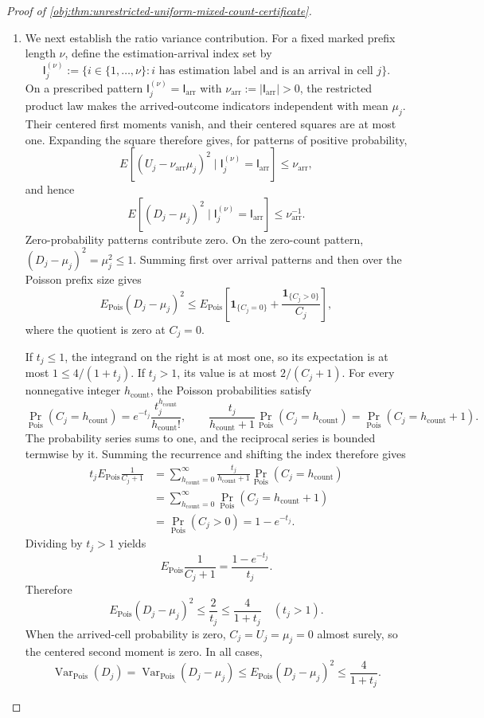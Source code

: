 \begin{proof}[Proof of \cref{obj:thm:unrestricted-uniform-mixed-count-certificate}]
\begin{enumerate}
\item We next establish the ratio variance contribution.
For a fixed marked prefix length \(\nu\), define the estimation-arrival
index set by
\[
\mathsf I_j^{(\nu)}
:=
\{i\in\{1,\ldots,\nu\}:
i\text{ has estimation label and is an arrival in cell }j\}.
\]
On a prescribed pattern \(\mathsf I_j^{(\nu)}=\mathsf I_{\mathrm{arr}}\) with
\(\nu_{\mathrm{arr}}:=|\mathsf I_{\mathrm{arr}}|>0\), the restricted product law makes the
arrived-outcome indicators independent with mean \(\mu_j\). Their centered
first moments vanish, and their centered squares are at most one.
Expanding the square therefore gives, for patterns of positive
probability,
\[
E\!\left[
(U_j-\nu_{\mathrm{arr}}\mu_j)^2
\mid\mathsf I_j^{(\nu)}=\mathsf I_{\mathrm{arr}}
\right]\le\nu_{\mathrm{arr}},
\]
and hence
\[
E\!\left[
(D_j-\mu_j)^2
\mid\mathsf I_j^{(\nu)}=\mathsf I_{\mathrm{arr}}
\right]\le\nu_{\mathrm{arr}}^{-1}.
\]
Zero-probability patterns contribute zero. On the zero-count pattern,
\((D_j-\mu_j)^2=\mu_j^2\le1\). Summing first over arrival patterns and then
over the Poisson prefix size gives
\[
E_{\mathrm{Pois}}(D_j-\mu_j)^2
\le
E_{\mathrm{Pois}}\!\left[
\mathbf1_{\{C_j=0\}}
+\frac{\mathbf1_{\{C_j>0\}}}{C_j}
\right],
\]
where the quotient is zero at \(C_j=0\).

If \(t_j\le1\), the integrand on the right is at most one, so its expectation
is at most \(1\le4/(1+t_j)\). If \(t_j>1\), its value is at most
\(2/(C_j+1)\). For every nonnegative integer \(h_{\mathrm{count}}\), the Poisson probabilities satisfy
\[
\Pr_{\mathrm{Pois}}(C_j=h_{\mathrm{count}})
=e^{-t_j}\frac{t_j^{h_{\mathrm{count}}}}{h_{\mathrm{count}}!},
\qquad
\frac{t_j}{h_{\mathrm{count}}+1}
\Pr_{\mathrm{Pois}}(C_j=h_{\mathrm{count}})
=
\Pr_{\mathrm{Pois}}(C_j=h_{\mathrm{count}}+1).
\]
The probability series sums to one, and the reciprocal series is bounded termwise by it. Summing the recurrence and shifting the index therefore gives
\[
\begin{aligned}
t_jE_{\mathrm{Pois}}\frac1{C_j+1}
&=
\sum_{h_{\mathrm{count}}=0}^{\infty}
\frac{t_j}{h_{\mathrm{count}}+1}
\Pr_{\mathrm{Pois}}(C_j=h_{\mathrm{count}})\\
&=
\sum_{h_{\mathrm{count}}=0}^{\infty}
\Pr_{\mathrm{Pois}}(C_j=h_{\mathrm{count}}+1)\\
&=\Pr_{\mathrm{Pois}}(C_j>0)
=1-e^{-t_j}.
\end{aligned}
\]
Dividing by \(t_j>1\) yields
\[
E_{\mathrm{Pois}}\frac1{C_j+1}
=\frac{1-e^{-t_j}}{t_j}.
\]
Therefore
\[
E_{\mathrm{Pois}}(D_j-\mu_j)^2
\le\frac2{t_j}\le\frac4{1+t_j}
\quad(t_j>1).
\]
When the arrived-cell probability is zero, \(C_j=U_j=\mu_j=0\)
almost surely, so the centered second moment is zero. In all cases,
\[
\operatorname{Var}_{\mathrm{Pois}}(D_j)
=
\operatorname{Var}_{\mathrm{Pois}}(D_j-\mu_j)
\le E_{\mathrm{Pois}}(D_j-\mu_j)^2
\le\frac4{1+t_j}.
\]


\end{enumerate}
\end{proof}
